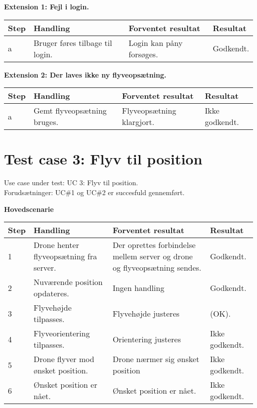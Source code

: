 \textbf{Extension 1: Fejl i login.}
\begin{table}[H]
	\centering
		\begin{tabular}{|l|p{5 cm}|p{5 cm}|p{2.5 cm}|} 
		\hline
			\textbf{Step} & \textbf{Handling} & \textbf{Forventet resultat} & \textbf{Resultat} \\ \hline
			a & Bruger føres tilbage til login. & Login kan påny forsøges. & Godkendt. \\ \hline
		\end{tabular}
\end{table}

\textbf{Extension 2: Der laves ikke ny flyveopsætning.}
\begin{table}[H]
	\centering
		\begin{tabular}{|l|p{5 cm}|p{5 cm}|p{2.5 cm}|} 
		\hline
			\textbf{Step} & \textbf{Handling} & \textbf{Forventet resultat} & \textbf{Resultat} \\ \hline
			a & Gemt flyveopsætning bruges. & Flyveopsætning klargjort. & Ikke godkendt.\\ \hline
		\end{tabular}
\end{table}

\newpage

\section{Test case 3: Flyv til position}
Use case under test: UC 3: Flyv til position.\\
Forudsætninger:	UC\#1 og UC\#2 er succesfuld gennemført.

\textbf{Hovedscenarie}
\begin{table}[H]
	\centering
		\begin{tabular}{|l|p{5 cm}|p{5 cm}|p{2.5 cm}|} 
		\hline
			\textbf{Step} & \textbf{Handling} & \textbf{Forventet resultat} & \textbf{Resultat} \\ \hline
			1 & Drone henter flyveopsætning fra server. & Der oprettes forbindelse \newline mellem server og drone \newline og flyveopsætning sendes. & Godkendt. \\ \hline
			2 & Nuværende position \newline opdateres. & Ingen handling  &  Godkendt. \\ \hline
			3 & Flyvehøjde tilpasses. & Flyvehøjde justeres & (OK). \\ \hline
			4 & Flyveorientering tilpasses. & Orientering justeres & Ikke godkendt. \\ \hline
			5 & Drone flyver mod \newline ønsket position. & Drone nærmer sig \newline ønsket position  &  Ikke godkendt. \\ \hline
			6 & Ønsket position er nået. & Ønsket position er nået. & Ikke godkendt. \\ \hline
		\end{tabular}
\end{table}

